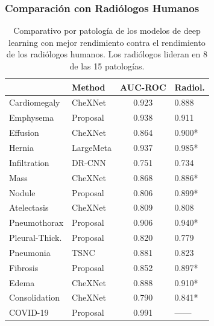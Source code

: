 \begin{frame}
\frametitle{Comparación con Radiólogos Humanos}
\begin{table}[ht!]
    \centering
    \tiny
    \begin{tabular}{|l||l|c|l|}
        \hline
                        &	Method	&	AUC-ROC	& Radiol.	\\
        \hline\hline
        Cardiomegaly	&	CheXNet	    & 0.923 &   0.888	\\
        Emphysema	    &	Proposal    & 0.938	&   0.911	\\
        Effusion	    &	CheXNet	    & 0.864 &   0.900*	\\
        Hernia	        &	LargeMeta   & 0.937	&   0.985*	\\
        Infiltration	&	DR-CNN	    & 0.751 &	0.734	\\
        Mass	        &	CheXNet	    & 0.868	&	0.886*	\\
        Nodule	        &	Proposal    & 0.806	&	0.899*	\\
        Atelectasis	    &	CheXNet	    & 0.809 &	0.808	\\
        Pneumothorax	&	Proposal    & 0.906 &	0.940*	\\
        Pleural-Thick.	&	Proposal    & 0.820	&	0.779	\\
        Pneumonia	    &	TSNC	    & 0.881 &	0.823	\\
        Fibrosis	    &	Proposal    & 0.852 &	0.897*	\\
        Edema	        &	CheXNet	    & 0.888 &	0.910*	\\
        Consolidation	&	CheXNet	    & 0.790 &	0.841*	\\
        COVID-19	    &	Proposal    & 0.991 &	------	\\
        \hline
    \end{tabular}
    \caption{Comparativo por patología de los modelos de deep learning con mejor rendimiento contra
             el rendimiento de los radiólogos humanos. Los radiólogos lideran en 8 de las 15
             patologías.}
    \label{table_dl_human}
\end{table}
\end{frame}


